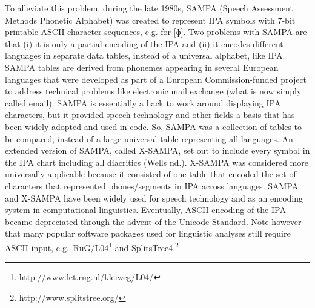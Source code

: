 To alleviate this problem, during the late 1980s, SAMPA (Speech Assessment Methods Phonetic Alphabet) was created to represent IPA symbols with 7-bit printable ASCII character sequences, e.g. for [ɸ]. Two problems with SAMPA are that (i) it is only a partial encoding of the IPA and (ii) it encodes different languages in separate data tables, instead of a universal alphabet, like IPA. SAMPA tables are derived from phonemes appearing in several European languages that were developed as part of a European Commission-funded project to address technical problems like electronic mail exchange (what is now simply called email). SAMPA is essentially a hack to work around displaying IPA characters, but it provided speech technology and other fields a basis that has been widely adopted and used in code. So, SAMPA was a collection of tables to be compared, instead of a large universal table representing all languages. An extended version of SAMPA, called X-SAMPA, set out to include every symbol in the IPA chart including all diacritics (Wells nd.). X-SAMPA was considered more universally applicable because it consisted of one table that encoded the set of characters that represented phones/segments in IPA across languages. SAMPA and X-SAMPA have been widely used for speech technology and as an encoding system in computational linguistics. Eventually, ASCII-encoding of the IPA became depreciated through the advent of the Unicode Standard. Note however that many popular software packages used for linguistic analyses still require ASCII input, e.g.~RuG/L04\footnote{http://www.let.rug.nl/kleiweg/L04/} and SplitsTree4.\footnote{http://www.splitstree.org/}

